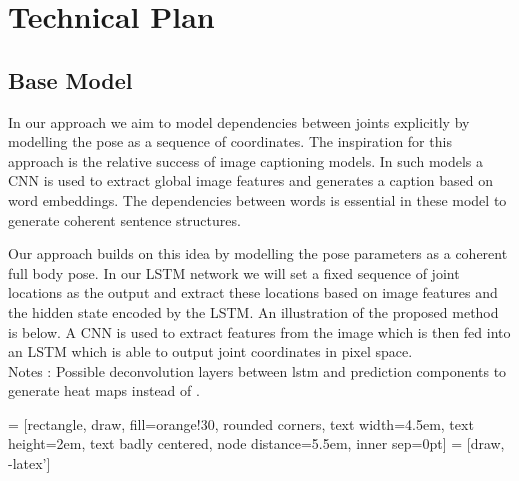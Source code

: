 \documentclass[12pt]{article}
\begin{document}
\section{Technical Plan}



\subsection{Base Model}

In our approach we aim to model dependencies between joints explicitly by modelling the pose as a sequence of coordinates. The inspiration for this approach is the relative success of image captioning models. In such models a CNN is used to extract global image features and generates a caption based on word embeddings. The dependencies between words is essential in these model to generate coherent sentence structures.

Our approach builds on this idea by modelling the pose parameters as a coherent full body pose. In our LSTM network we will set a fixed sequence of joint locations as the output and extract these locations based on image features and the hidden state encoded by the LSTM. An illustration of the proposed method is below. A CNN is used to extract features from the image which is then fed into an LSTM which is able to output joint coordinates in pixel space.\\


Notes : Possible deconvolution layers between lstm and prediction components to generate heat maps instead of .

 = [rectangle, draw, fill=orange!30, rounded corners, text width=4.5em, text height=2em, text badly centered, node distance=5.5em, inner sep=0pt]
 = [draw, -latex']

\begin{center}
\end{center}
\end{document}

